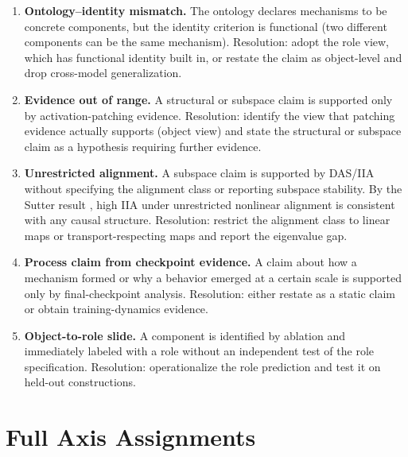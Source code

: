 \documentclass[11pt]{article}
\theoremstyle{remark}
\begin{document}
\begin{enumerate}[leftmargin=*, label=(\arabic*)]

\item \textbf{Ontology--identity mismatch.}  The ontology declares
      mechanisms to be concrete components, but the identity criterion is
      functional (two different components can be the same mechanism).
      Resolution: adopt the role view, which has functional identity built
      in, or restate the claim as object-level and drop cross-model
      generalization.

\item \textbf{Evidence out of range.}  A structural or subspace claim
      is supported only by activation-patching evidence.  Resolution:
      identify the view that patching evidence actually supports (object
      view) and state the structural or subspace claim as a hypothesis
      requiring further evidence.

\item \textbf{Unrestricted alignment.}  A subspace claim is supported
      by DAS/IIA without specifying the alignment class or reporting
      subspace stability.  By the Sutter result \citep{sutter2025}, high
      IIA under unrestricted nonlinear alignment is consistent with any
      causal structure.  Resolution: restrict the alignment class to
      linear maps or transport-respecting maps and report the eigenvalue gap.

\item \textbf{Process claim from checkpoint evidence.}  A claim about
      how a mechanism formed or why a behavior emerged at a certain scale
      is supported only by final-checkpoint analysis.  Resolution: either
      restate as a static claim or obtain training-dynamics evidence.

\item \textbf{Object-to-role slide.}  A component is identified by
      ablation and immediately labeled with a role without an independent
      test of the role specification.  Resolution: operationalize the role
      prediction and test it on held-out constructions.

\end{enumerate}

\section{Full Axis Assignments}\label{app:axes}
\end{document}
